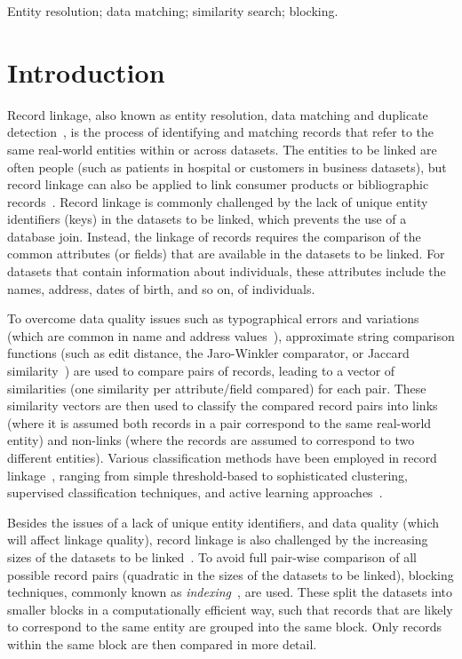 \documentclass{llncs}
\begin{document}
\keywords Entity resolution; data matching; similarity search;
         blocking.



\section{Introduction}
\label{sec-intro}


Record linkage, also known as entity resolution, data matching and
duplicate detection~\cite{Chr12}, is the process of identifying and
matching records that refer to the same real-world entities within or
across datasets. The entities to be linked are often people (such as
patients in hospital or customers in business datasets), but record
linkage can also be applied to link consumer products or bibliographic
records~\cite{Chr12}. Record linkage is commonly challenged by the lack
of unique entity identifiers (keys) in the datasets to be linked, which
prevents the use of a database join. Instead, the linkage of records
requires the comparison of the common attributes (or fields) that are available
in the datasets to be linked. For datasets that contain
information about individuals, these attributes include the names,
address, dates of birth, and so on, of individuals.

To overcome data quality issues such as typographical errors and
variations (which are common in name and address values~\cite{Chr12}),
approximate string comparison functions (such as edit distance, the
Jaro-Winkler comparator, or Jaccard similarity~\cite{Chr12}) are used to
compare pairs of records, leading to a vector of similarities (one
similarity per attribute/field compared) for each pair. These similarity
vectors are then used to classify the compared record pairs into links
(where it is assumed both records in a pair correspond to the same
real-world entity) and non-links (where the records are assumed to
correspond to two different entities). Various classification methods
have been employed in record linkage~\cite{Chr12,Don15}, ranging from
simple threshold-based to sophisticated clustering, supervised
classification techniques, and active learning approaches~\cite{Wan15}.

Besides the issues of a lack of unique entity identifiers, and data
quality (which will affect linkage quality), record linkage is also
challenged by the increasing sizes of the datasets to be
linked~\cite{Don15}. To avoid full pair-wise comparison of all possible
record pairs (quadratic in the sizes of the datasets to be linked),
blocking techniques, commonly known as \emph{indexing}~\cite{Chr12b},
are used. These split the datasets into smaller blocks in a
computationally efficient way, such that records that are likely to
correspond to the same entity are grouped into the same block. Only
records within the same block are then compared in more detail.
\end{document}
